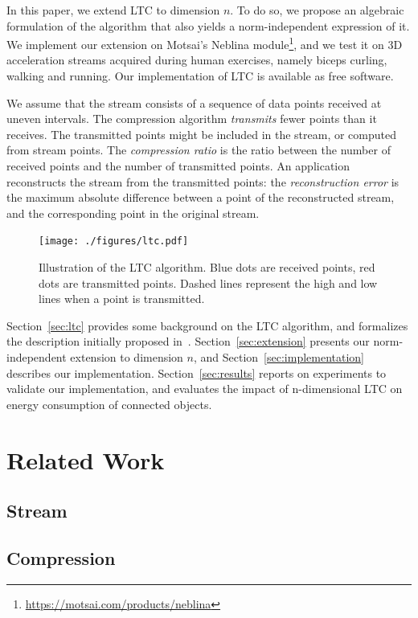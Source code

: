 \documentclass{report}
\begin{document}
In this paper, we extend LTC to dimension $n$. To do so, we propose an 
algebraic formulation of the algorithm that also yields a 
norm-independent expression of it. We implement our extension on 
Motsai's Neblina module\footnote{\url{ https://motsai.com/products/neblina}}, and we test it on 3D acceleration streams 
acquired during human exercises, namely biceps curling, walking and 
running. Our implementation of LTC is available as free software.

We assume that the stream consists of a sequence of data points 
received at uneven intervals. The compression algorithm 
\emph{transmits} fewer points than it receives. The transmitted points 
might be included in the stream, or computed from stream points. The 
\emph{compression ratio} is the ratio between the number of received 
points and the number of transmitted points. An application 
reconstructs the stream from the transmitted points: the 
\emph{reconstruction error} is the maximum absolute difference between 
a point of the reconstructed stream, and the corresponding 
point in the original stream.

\setlength{\textfloatsep}{0pt}
\begin{figure}[b]
\centering
\texttt{[image: ./figures/ltc.pdf]}
\caption{Illustration of the LTC algorithm. Blue 
dots are received points, red dots are transmitted points. Dashed lines 
represent the high and low lines when a point is 
transmitted.\vspace*{-0.3cm}}
\label{fig:ltc}
\end{figure}

Section~\ref{sec:ltc} provides some background on the LTC algorithm, 
and formalizes the description initially proposed 
in~\cite{schoellhammer2004lightweight}. Section~\ref{sec:extension} 
presents our norm-independent extension to dimension $n$, and 
Section~\ref{sec:implementation} describes our implementation. 
Section~\ref{sec:results} reports on experiments to validate our 
implementation, and evaluates the impact of n-dimensional LTC on 
energy consumption of connected objects.

\chapter{Related Work}
\section{Stream}


\section{Compression}
\end{document}
